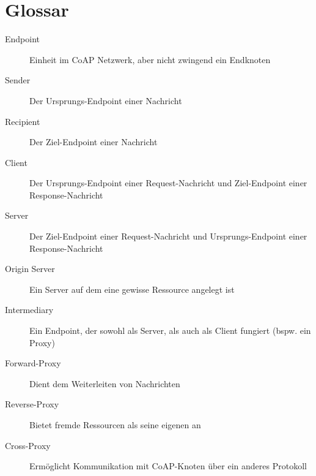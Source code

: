 \section*{Glossar}
\thispagestyle{plain}
\begin{description}
  \item[Endpoint] Einheit im \acs{CoAP} Netzwerk, aber nicht zwingend ein Endknoten
  \vspace{18pt}
  \item[Sender] Der Ursprungs-Endpoint einer Nachricht
  \item[Recipient] Der Ziel-Endpoint einer Nachricht
  \vspace{18pt}
  \item[Client] Der Ursprungs-Endpoint einer Request-Nachricht und Ziel-Endpoint einer Response-Nachricht
  \item[Server] Der Ziel-Endpoint einer Request-Nachricht und Ursprungs-Endpoint einer Response-Nachricht
  \vspace{18pt} 
  \item[Origin Server] Ein Server auf dem eine gewisse Ressource angelegt ist
  \item[Intermediary] Ein Endpoint, der sowohl als Server, als auch als Client fungiert (bspw. ein Proxy)
  \vspace{18pt}
  \item[Forward-Proxy] Dient dem Weiterleiten von Nachrichten
  \item[Reverse-Proxy] Bietet fremde Ressourcen als seine eigenen an
  \item[Cross-Proxy] Ermöglicht Kommunikation mit \acs{CoAP}-Knoten über ein anderes Protokoll
\end{description}